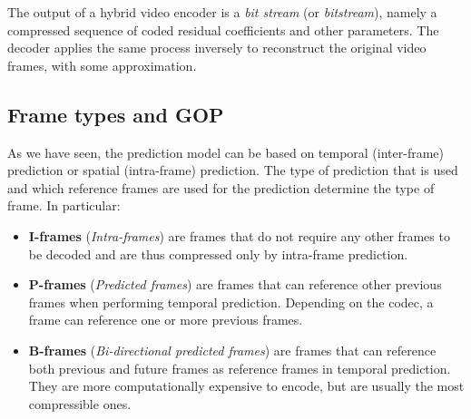 

The output of a hybrid video encoder is a \textit{bit stream} (or \textit{bitstream}), namely a compressed sequence of coded residual coefficients and other parameters. The decoder applies the same process inversely to reconstruct the original video frames, with some approximation.

\subsection{Frame types and GOP}
\label{sec:bg/compression/gop}

As we have seen, the prediction model can be based on temporal (inter-frame) prediction or spatial (intra-frame) prediction. The type of prediction that is used and which reference frames are used for the prediction determine the type of frame. In particular:

\begin{itemize}
    \item \textbf{I-frames} (\textit{Intra-frames}) are frames that do not require any other frames to be decoded and are thus compressed only by intra-frame prediction.
    \item \textbf{P-frames} (\textit{Predicted frames}) are frames that can reference other previous frames when performing temporal prediction. Depending on the codec, a frame can reference one or more previous frames.
    \item \textbf{B-frames} (\textit{Bi-directional predicted frames}) are frames that can reference both previous and future frames as reference frames in temporal prediction. They are more computationally expensive to encode, but are usually the most compressible ones.
\end{itemize}

